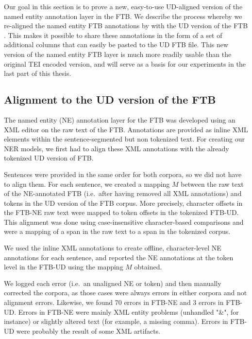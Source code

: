 Our goal in this section is to prove a new, easy-to-use UD-aligned version of the named entity annotation layer in the FTB. We describe the process whereby we re-aligned the named entity FTB annotations by \citet{sagot-etal-2012-annotation} with the UD version of the FTB \citep{candito-etal-2010-statistical}. This makes it possible to share these annotations in the form of a set of additional columns that can easily be pasted to the UD FTB file. This new version of the named entity FTB layer is much more readily usable than the original TEI encoded version, and will serve as a basis for our experiments in the last part of this thesis.


\subsection{Alignment to the UD version of the FTB}
\label{subsec:alignment}

The named entity (NE) annotation layer for the FTB was developed using an XML editor on the raw text of the FTB. Annotations are provided as inline XML elements within the sentence-segmented but non tokenized text. For creating our NER models, we first had to align these XML annotations with the already tokenized UD version of FTB.

Sentences were provided in the same order for both corpora, so we did not have to align them. For each sentence, we created a mapping $M$ between the raw text of the NE-annotated FTB (i.e.~after having removed all XML annotations) and tokens in the UD version of the FTB corpus. More precisely, character offsets in the FTB-NE raw text were mapped to token offsets in the tokenized FTB-UD. This alignment was done using case-insensitive character-based comparisons and were a mapping of a span in the raw text to a span in the tokenized corpus.

We used the inline XML annotations to create offline, character-level NE annotations for each sentence, and reported the NE annotations at the token level in the FTB-UD using the mapping $M$ obtained.

We logged each error (i.e.~an unaligned NE or token) and then manually corrected the corpora, as those cases were always errors in either corpora and not alignment errors. Likewise, we found 70 errors in FTB-NE and 3 errors in FTB-UD. Errors in FTB-NE were mainly XML entity problems (unhandled "\&", for instance) or slightly altered text (for example, a missing comma). Errors in FTB-UD were probably the result of some XML artifacts.

